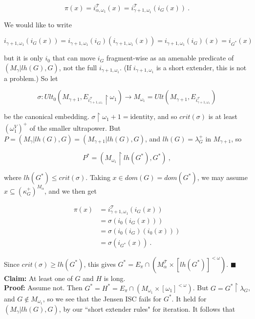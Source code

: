 \documentclass[12pt]{article}
\begin{document}
\[
\pi(x) = i^{\mathscr{T}}_{\alpha , \omega_1} (x) = i^{\mathscr{T}}_{\gamma + 1, \omega_1} (i_G (x)) \ .
\]

We would like to write

\[
i_{\gamma +1 , \omega_1} (i_G (x)) = i_{\gamma +1 , \omega_1} (i_G) (i_{\gamma +1 , \omega_1} (x)) = i_{\gamma +1 , \omega_1} (i_G) (x) = i_{G^*} (x)
\]

but it is only $i_0$ that can move $i_G$ fragment-wise as an amenable predicate of $(M_\gamma | lh(G), G)$, not the full $i_{\gamma +1 , \omega_1}$.  (If $i_{\gamma +1 , \omega_1}$ is a short extender, this is not a problem.)  So let

\[
\sigma: Ult_0 ( M_{\gamma + 1} , E_{i^{\mathscr{T}}_{\gamma +1 , \omega_1}} \restriction \omega_1 ) \longrightarrow M_{\omega_1} = Ult ( M_{\gamma + 1}, E_{i^{\mathscr{T}}_{\gamma +1 , \omega_1}} )
\]

be the canonical embedding.  $\sigma \restriction \omega_1 + 1 = \text{identity}$, and so $crit(\sigma )$ is at least $( \omega_1^V)^+$ of the smaller ultrapower.  But $P = ( M_\gamma | lh (G) , G) = (M_{\gamma + 1} | lh (G) , G )$, and $lh (G) = \lambda_G^+$ in $M_{\gamma + 1}$, so

\[
P^* = ( M_{\omega_1} \restriction lh (G^*), G^* ) \ ,
\]

where $lh(G^*) \leq crit( \sigma)$.  Taking $x \in dom (G) = dom(G^*)$, we may assume $x \subseteq (\kappa_G^+)^{M_\alpha}$, and we then get

\[
\begin{split}
 \pi(x) & = i^{\mathscr{T}}_{\gamma + 1 , \omega_1} (i_G (x))\\
 & = \sigma ( i_0 (i_G (x)))\\
 & = \sigma ( i_0 (i_G) ( i_0 (x)))\\
 & = \sigma ( i_{G^*} (x)) \ .
 \end{split}
 \]
   
   Since $crit (\sigma) \geq lh (G^*)$, this gives $G^* = E_\pi \cap ( M_\alpha^{\mathscr{T}} \times [ lh (G^*)]^{< \omega} )$. $\blacksquare$\\
  
  
\textbf{Claim:} At least one of $G$ and $H$ is long.\\

\indent \indent \textbf{Proof:} Assume not.  Then $G^* = H^* = E_\pi \cap (M_{\omega_1} \times [\omega_1 ]^{< \omega} )$.  But $G = G^* \restriction \lambda_G$, and $G \notin M_{\omega_1}$, so we see that the Jensen ISC fails for $G^*$.  It held for $(M_\gamma | lh(G), G)$, by our ``short extender rules" for iteration.  It follows that
\end{document}
